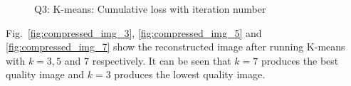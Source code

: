 \begin{figure}[!h]
	\caption{Q3: K-means: Cumulative loss with iteration number}
	\label{fig:q3_loss}
\end{figure}
Fig.~\ref{fig:compressed_img_3}, \ref{fig:compressed_img_5} and \ref{fig:compressed_img_7} show the reconstructed image after running K-means with $k=3,5$ and $7$ respectively. It can be seen that $k=7$ produces the best quality image and $k=3$ produces the lowest quality image.
